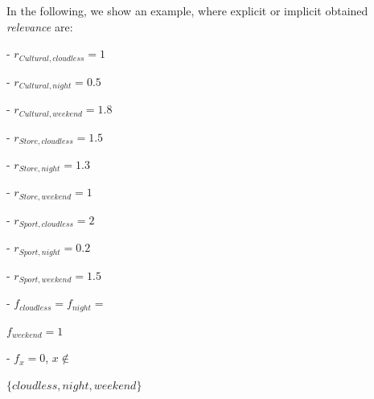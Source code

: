 In the following, we show an example, where explicit or implicit obtained \textit{relevance} are:



\begin{minipage}[b]{0.42\linewidth}
    
    \noindent 
    - $r_{Cultural, cloudless} = 1$
    
    \noindent 
    - $r_{Cultural, night} = 0.5$
    
    \noindent 
    - $r_{Cultural, weekend} = 1.8$
    
    \noindent 
    - $r_{Store, cloudless} = 1.5$
    
    \noindent 
    - $r_{Store, night} = 1.3$
    
    \noindent
    - $r_{Store, weekend} = 1$
\end{minipage}
\hspace{0.1cm}
\begin{minipage}[b]{0.47\linewidth}
\noindent 
- $r_{Sport, cloudless} = 2$

\noindent
    - $r_{Sport, night} = 0.2$
    
\noindent 
- $r_{Sport, weekend} = 1.5$

\noindent 
- $f_{cloudless} = f_{night} =$

\hspace{0.1cm} $f_{weekend} = 1$

\noindent 
- $f_x = 0$, $x \notin$ 

\hspace{0.1cm}$\{cloudless, night, weekend\}$
\end{minipage}\\










